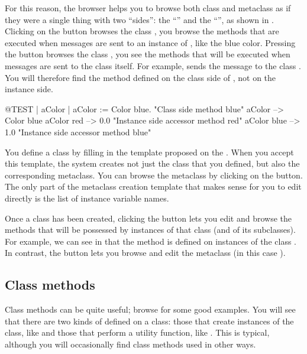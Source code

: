 \documentclass[a4paper,10pt,twoside]{book}
\begin{document}
For this reason, the browser  helps you to browse both class and metaclass as if they were a single thing with two ``sides'': the ``'' and the ``'', as shown in . Clicking 
on the  button browses the class , \ie you browse the methods that are executed when messages
are sent to an instance of , like the blue color. Pressing the  button browses the class , \ie you see
the methods that will be executed when messages are sent to the class  itself.
For example,  sends the message  to the class .
You will therefore find the method  defined on the class side of , not on the instance side.

\begin{code}{@TEST | aColor |}
aColor := Color blue.               "Class side method blue"
aColor        --> Color blue
aColor red  --> 0.0         "Instance side accessor method red"
aColor blue --> 1.0        "Instance side accessor method blue"
\end{code}

You define a class by filling in the template proposed on the .
When you accept this template, the system creates not just the class that you defined, but also the corresponding metaclass.
You can browse the metaclass by clicking on the  button.
The only part of the metaclass creation template that makes sense for you to edit directly is the list of instance variable names.

Once a class has been created, clicking the  button lets you edit and browse the methods that will be possessed by instances of that class (and of its subclasses). For example, we can see in  that the method  is defined on instances of the class .
In contrast, the  button lets you browse and edit the metaclass (in this case ).

\subsection{Class methods} 

Class methods can be quite useful; browse  for some good examples.
You will see that there are two kinds of  defined on a class: those that create instances of the class, like  and those that perform a utility function, like 
.
This is typical, although you will occasionally find class methods used in other ways.
\end{document}
